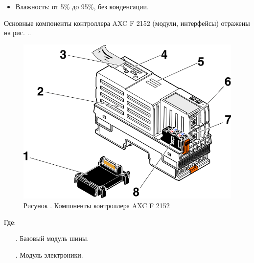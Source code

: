 {\begin{itemize}[leftmargin=2.15cm, labelwidth=0.65cm, labelsep=0.0cm]
\begin{itemize}[leftmargin=1.15cm, labelwidth=0.65cm, labelsep=0.0cm]
			\item Влажность: от 5\% до 95\%, без конденсации.
			
		\end{itemize}
		
		\addtocounter{itemcntr}{1}
		
		\setcounter{itemcntr}{1}
	\end{itemize}
	 
	
	\par \redline Основные компоненты контроллера AXC F 2152 (модули, интерфейсы) отражены на рис. \thechaptercntr.\theimagecntr. 
	
	\begin{figure}[H]
		\centering
		\def\svgwidth{\textwidth}
		\includegraphics[scale=1.8]{images/pclnext_complect.png}
		\caption*{\gostFont Рисунок \thechaptercntr .\theimagecntr \spc {--} Компоненты контроллера AXC F 2152}
	\end{figure}  \addtocounter{imagecntr}{1}
	
	\par \redline Где:
	
	\begin{itemize}[leftmargin=2.15cm, labelwidth=0.65cm, labelsep=0.0cm] 
		
		\item[\theitemcntr. ]	Базовый модуль шины.
		
		\addtocounter{itemcntr}{1}
		
		\item[\theitemcntr. ] 	Модуль электроники.
		
		\addtocounter{itemcntr}{1}
		

\end{itemize}}
